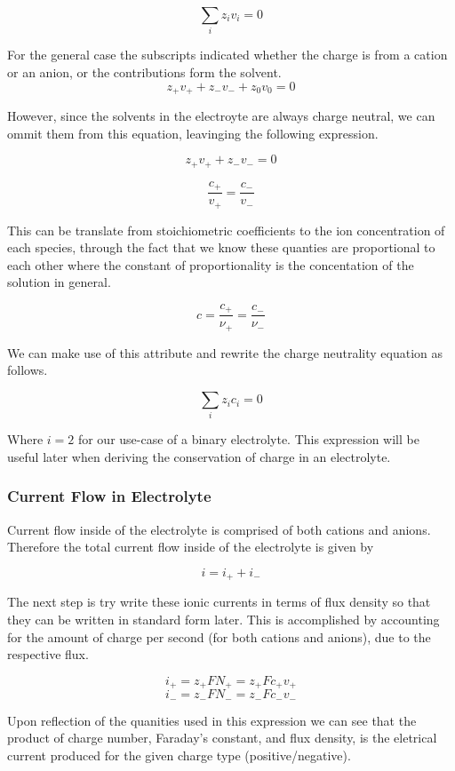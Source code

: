 \documentclass[lettersize,journal]{IEEEtran}
\begin{document}
\[
\sum_{i} z_{i} v_{i}=0
\]

For the general case the subscripts indicated whether the charge is from a cation or an anion, or the contributions form the solvent.
\[
z_{+} v_{+}+z_{-} v_{-}+z_{0} v_{0}=0
\]

However, since the solvents in the electroyte are always charge neutral, we can ommit them from this equation, leavinging the following expression.

\[
z_{+} v_{+}+z_{-} v_{-}=0
\]

\[
\frac{c_{+}}{v_{+}}=\frac{c_{-}}{v_{-}}
\]

This can be translate from stoichiometric coefficients to the ion concentration of each species, through the fact that we know these quanties are proportional to each other where the constant of proportionality is the concentation of the solution in general.

\[
  c = \frac{c_{+}}{\nu_{+}} = \frac{c_{-}}{\nu_{-}}
\]

We can make use of this attribute and rewrite the charge neutrality equation as follows.

\[
    \sum_{i} z_i c_i = 0
\]

Where $ i=2$ for our use-case of a binary electrolyte. This expression will be useful later when deriving the conservation of charge in an electrolyte.

\subsubsection{ Current Flow in Electrolyte }

Current flow inside of the electrolyte is comprised of both cations and anions. Therefore the total current flow inside of the electrolyte is given by

\[
  i = i_{+} + i_{-}
\]

The next step is try write these ionic currents in terms of flux density so that they can be written in standard form later. This is accomplished by accounting for the amount of charge per second (for both cations and anions), due to the respective flux.

\[
  i_+ =  z_+ FN_+ = z_{+}Fc_{+}v_{+}
\]
\[
  i_- =  z_- FN_- = z_{-}Fc_{-}v_{-}
\]

Upon reflection of the quanities used in this expression we can see that the product of charge number, Faraday's constant, and flux density, is the eletrical current produced for the given charge type (positive/negative).
\end{document}
